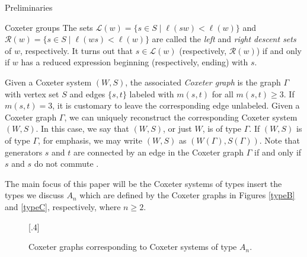 \documentclass[11pt]{amsart}
\theoremstyle{definition}
\numberwithin{equation}{section}
\newcommand{\C}{\widetilde{C}}
\newcommand{\x}{\mathsf{x}}
\renewcommand{\L}{\mathcal{L}}
\newcommand{\R}{\mathcal{R}}
\renewcommand{\(}{\left(}
\renewcommand{\)}{\right)}
\begin{document}
\begin{section}{Preliminaries}
\begin{subsection}{Coxeter groups}
The sets $\L(w)=\{s \in S\mid \ell(sw) < \ell(w)\}$ and $\R(w)=\{s \in S\mid \ell(ws) < \ell(w)\}$ are called the \emph{left} and \emph{right descent sets} of $w$, respectively.  It turns out that $s \in \L(w)$ (respectively, $\R(w)$) if and only if $w$ has a reduced expression beginning (respectively, ending) with $s$.

Given a Coxeter system $(W,S)$, the associated \emph{Coxeter graph} is the graph $\Gamma$ with vertex set $S$ and edges $\{s,t\}$ labeled with $m(s,t)$ for all $m(s,t)\geq 3$.  If $m(s,t)=3$, it is customary to leave the corresponding edge unlabeled.  Given a Coxeter graph $\Gamma$, we can uniquely reconstruct the corresponding Coxeter system $(W,S)$.  In this case, we say that $(W,S)$, or just $W$, is of type $\Gamma$. If $(W,S)$ is of type $\Gamma$, for emphasis, we may write $(W,S)$ as $(W(\Gamma),S(\Gamma))$.  Note that generators $s$ and $t$ are connected by an edge in the Coxeter graph $\Gamma$ if and only if $s$ and $s$ do not commute \cite{Humphreys1990}.

The main focus of this paper will be the Coxeter systems of types {\color{red} insert the types we discuss} $A_n$ which are defined by the Coxeter graphs in Figures \ref{typeB} and \ref{typeC}, respectively, where $n\geq 2$.

\begin{figure}[!ht]
[.4\textwidth]{
}
\caption{Coxeter graphs corresponding to Coxeter systems of type $A_{n}$.}
\end{figure}


\end{subsection}
\end{section}
\end{document}
